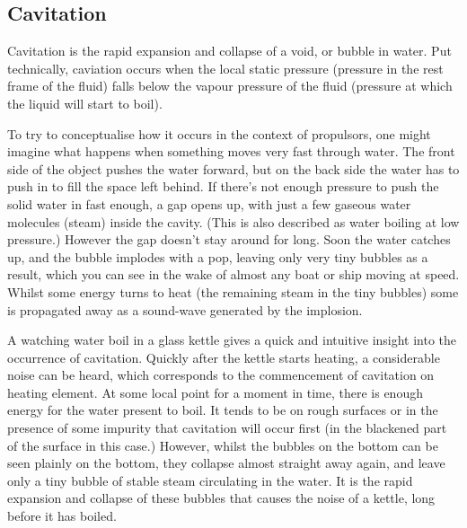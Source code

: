 \documentclass{article}\usepackage[]{graphicx}\usepackage[]{color}
\begin{document}
\begin{appendices}
\subsection{Cavitation}
Cavitation is the rapid expansion and collapse of a void, or bubble in water. Put technically, caviation occurs when the local static pressure (pressure in the rest frame of the fluid) falls below the vapour pressure of the fluid (pressure at which the liquid will start to boil).

To try to conceptualise how it occurs in the context of propulsors, one might imagine what happens when something moves very fast through water.  The front side of the object pushes the water forward, but on the back side the water has to push in to fill the space left behind.  If there’s not enough pressure to push the solid water in fast enough, a gap opens up, with just a few gaseous water molecules (steam) inside the cavity.  (This is also described as water boiling at low pressure.)  However the gap doesn’t stay around for long.  Soon the water catches up, and the bubble implodes with a pop, leaving only very tiny bubbles as a result, which you can see in the wake of almost any boat or ship moving at speed.  Whilst some energy turns to heat (the remaining steam in the tiny bubbles) some is propagated away as a sound-wave generated by the implosion.

A watching water boil in a glass kettle gives a quick and intuitive insight into the occurrence of cavitation.  Quickly after the kettle starts heating, a considerable noise can be heard, which corresponds to the commencement of cavitation on heating element. At some local point for a moment in time, there is enough energy for the water present to boil.  It tends to be on rough surfaces or in the presence of some impurity that cavitation will occur first (in the blackened part of the surface in this case.)  However, whilst the bubbles on the bottom can be seen plainly on the bottom, they collapse almost straight away again, and leave only a tiny bubble of stable steam circulating in the water.  It is the rapid expansion and collapse of these bubbles that causes the noise of a kettle, long before it has boiled.

\begin{figure}[h]


\end{figure}
\end{appendices}
\end{document}
